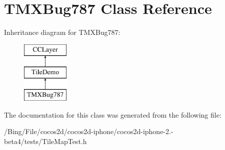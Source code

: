 \hypertarget{interface_t_m_x_bug787}{\section{T\-M\-X\-Bug787 Class Reference}
\label{interface_t_m_x_bug787}
}
Inheritance diagram for T\-M\-X\-Bug787\-:\begin{figure}[H]
\begin{center}
\leavevmode
\includegraphics[height=3.000000cm]{interface_t_m_x_bug787}
\end{center}
\end{figure}


The documentation for this class was generated from the following file\-:\begin{DoxyCompactItemize}
\item 
/\-Bing/\-File/cocos2d/cocos2d-\/iphone/cocos2d-\/iphone-\/2.-\/beta4/tests/Tile\-Map\-Test.\-h\end{DoxyCompactItemize}
